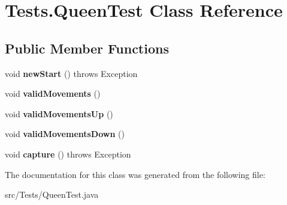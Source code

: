 \hypertarget{class_tests_1_1_queen_test}{}\section{Tests.\+Queen\+Test Class Reference}
\label{class_tests_1_1_queen_test}
\subsection*{Public Member Functions}
\begin{DoxyCompactItemize}
\item 
\mbox{\label{class_tests_1_1_queen_test_a8bd69332b6be70d7f76ed7c818f2887b}} 
void {\bfseries new\+Start} ()  throws Exception
\item 
\mbox{\label{class_tests_1_1_queen_test_ad7441261fb59635664b6db2219ce7ebd}} 
void {\bfseries valid\+Movements} ()
\item 
\mbox{\label{class_tests_1_1_queen_test_a8ee094e0194b63141e22a505f7883592}} 
void {\bfseries valid\+Movements\+Up} ()
\item 
\mbox{\label{class_tests_1_1_queen_test_aed4049e484d9eb959ff6542548f2b1f1}} 
void {\bfseries valid\+Movements\+Down} ()
\item 
\mbox{\label{class_tests_1_1_queen_test_aa4037ca413dde45e855c193e7dc1db30}} 
void {\bfseries capture} ()  throws Exception 
\end{DoxyCompactItemize}


The documentation for this class was generated from the following file\+:\begin{DoxyCompactItemize}
\item 
src/\+Tests/Queen\+Test.\+java\end{DoxyCompactItemize}
